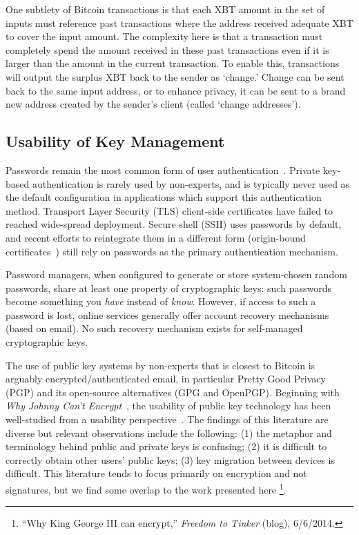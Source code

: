 One subtlety of Bitcoin transactions is that each XBT amount in the set of inputs must reference past transactions where the address received adequate XBT to cover the input amount. The complexity here is that a transaction must completely spend the amount received in these past transactions even if it is larger than the amount in the current transaction. To enable this, transactions will output the surplus XBT back to the sender as `change.' Change can be sent back to the same input address, or to enhance privacy, it can be sent to a brand new address created by the sender's client (called `change addresses'). 

\subsection{Usability of Key Management}

Passwords remain the most common form of user authentication~\cite{Herley.2012}. Private key-based authentication is rarely used by non-experts, and is typically never used as the default configuration in applications which support this authentication method. Transport Layer Security (TLS) client-side certificates have failed to reached wide-spread deployment. Secure shell (SSH) uses passwords by default, and recent efforts to reintegrate them in a different form (\eg origin-bound certificates~\cite{DCBW12}) still rely on passwords as the primary authentication mechanism.


Password managers, when configured to generate or store system-chosen random passwords, share at least one property of cryptographic keys: such passwords become something you \emph{have} instead of \emph{know}. However, if access to such a password is lost, online services generally offer account recovery mechanisms (\eg based on email). No such recovery mechanism exists for self-managed cryptographic keys.

The use of public key systems by non-experts that is closest to Bitcoin is arguably encrypted/authenticated email, in particular Pretty Good Privacy (PGP) and its open-source alternatives (\ie GPG and OpenPGP). Beginning with \emph{Why Johnny Can't Encrypt}~\cite{WT99}, the usability of public key technology has been well-studied from a usability perspective~\cite{GM05,GMSN+05,SBKH06,GFF06}. The findings of this literature are diverse but relevant observations include the following: (1) the metaphor and terminology behind public and private keys is confusing; (2) it is difficult to correctly obtain other users' public keys; (3) key migration between devices is difficult. This literature tends to focus primarily on encryption and not signatures, but we find some overlap to the work presented here \footnote{``Why King George III can encrypt,'' \textit{Freedom to Tinker} (blog), 6/6/2014.}.

